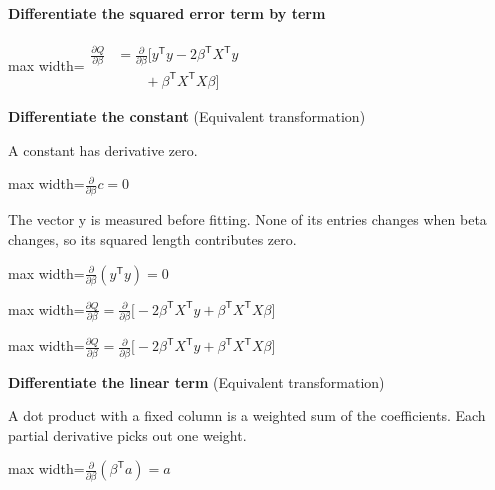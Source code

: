 \documentclass[11pt,a4paper]{article}
\begin{document}
\paragraph{Differentiate the squared error term by term}
\begin{center}\begin{adjustbox}{max width=\linewidth}$\displaystyle \begin{aligned}\frac{\partial Q}{\partial\beta}&=\frac{\partial}{\partial\beta}\bigl[y^{\mathsf T}y -2\beta^{\mathsf T}X^{\mathsf T}y\\&\qquad +\beta^{\mathsf T}X^{\mathsf T}X\beta\bigr]\end{aligned}$\end{adjustbox}\end{center}
\noindent\textbf{Differentiate the constant} (Equivalent transformation)\par
A constant has derivative zero.
\begin{center}\begin{adjustbox}{max width=\linewidth}$\displaystyle \frac{\partial}{\partial\beta}c=0$\end{adjustbox}\end{center}

The vector y is measured before fitting. None of its entries changes when beta changes, so its squared length contributes zero.
\begin{center}\begin{adjustbox}{max width=\linewidth}$\displaystyle \frac{\partial}{\partial\beta}(y^{\mathsf T}y)=0$\end{adjustbox}\end{center}


\begin{center}\begin{adjustbox}{max width=\linewidth}$\displaystyle \frac{\partial Q}{\partial\beta}=\frac{\partial}{\partial\beta}\bigl[-2\beta^{\mathsf T}X^{\mathsf T}y+\beta^{\mathsf T}X^{\mathsf T}X\beta\bigr]$\end{adjustbox}\end{center}

\begin{center}\begin{adjustbox}{max width=\linewidth}$\displaystyle \frac{\partial Q}{\partial\beta}=\frac{\partial}{\partial\beta}\bigl[-2\beta^{\mathsf T}X^{\mathsf T}y+\beta^{\mathsf T}X^{\mathsf T}X\beta\bigr]$\end{adjustbox}\end{center}
\noindent\textbf{Differentiate the linear term} (Equivalent transformation)\par
A dot product with a fixed column is a weighted sum of the coefficients. Each partial derivative picks out one weight.
\begin{center}\begin{adjustbox}{max width=\linewidth}$\displaystyle \frac{\partial}{\partial\beta}(\beta^{\mathsf T}a)=a$\end{adjustbox}\end{center}
\end{document}
